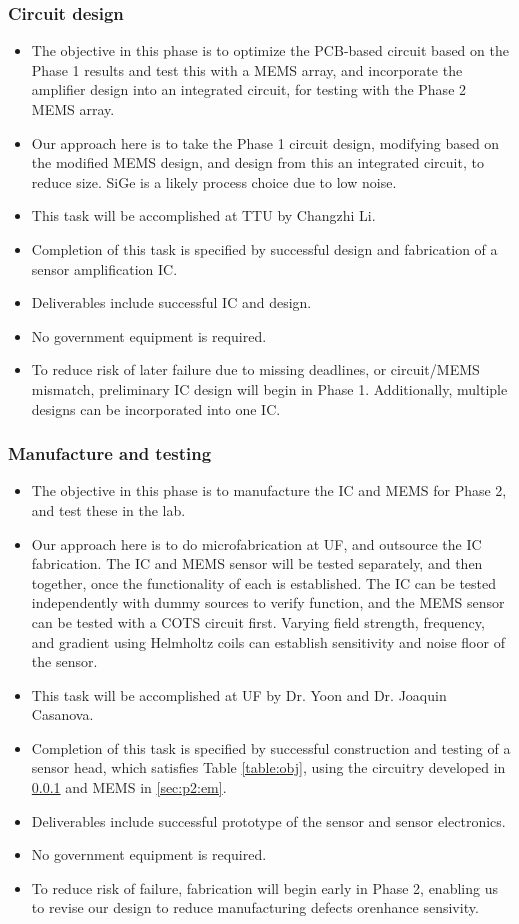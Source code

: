 \subsubsection{Circuit design}\label{sec:p2:cir}
\begin{itemize}
\item The objective in this phase is to optimize the PCB-based circuit based on the Phase 1 results and test this with a MEMS array, and incorporate the amplifier design into an integrated circuit, for testing with the Phase 2 MEMS array.
\item Our approach here is to take the Phase 1 circuit design, modifying based on the modified MEMS design, and design from this an integrated circuit, to reduce size. SiGe is a likely process choice due to low noise.
\item This task will be accomplished at TTU by Changzhi Li.
\item Completion of this task is specified by successful design and fabrication of a sensor amplification IC.
\item Deliverables include successful IC and design.
\item No government equipment is required.
\item To reduce risk of later failure due to missing deadlines, or circuit/MEMS mismatch, preliminary IC design will begin in Phase 1. Additionally, multiple designs can be incorporated into one IC.
\end{itemize}  
\subsubsection{Manufacture and testing}\label{sec:p2:test}
\begin{itemize}
\item The objective in this phase is to manufacture the IC and MEMS for Phase 2, and test these in the lab.
\item Our approach here is to do microfabrication at UF, and outsource the IC fabrication. The IC and MEMS sensor will be tested separately, and then together, once the functionality of each is established. The IC can be tested independently with dummy sources to verify function, and the MEMS sensor can be tested with a COTS circuit first. Varying field strength, frequency, and gradient using Helmholtz coils can establish sensitivity and noise floor of the sensor.
\item This task will be accomplished at UF by Dr. Yoon and Dr. Joaquin Casanova.
\item Completion of this task is specified by successful construction and testing of a sensor head, which satisfies Table \ref{table:obj}, using the circuitry developed in \ref{sec:p2:cir} and MEMS in \ref{sec:p2:em}.
\item Deliverables include successful prototype of the sensor and sensor electronics.
\item No government equipment is required.
\item To reduce risk of failure, fabrication will begin early in Phase 2, enabling us to revise our design to reduce manufacturing defects orenhance sensivity.
\end{itemize}

